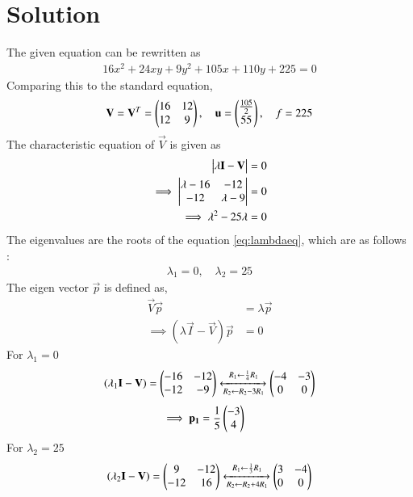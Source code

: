 \documentclass[journal,12pt,twocolumn]{IEEEtran}
\begin{document}
\section{Solution}
The given equation can be rewritten as
\begin{align}\label{eq:quadraticparabola}
    16x^2+24xy+9y^2+105x+110y+225 = 0
\end{align}
Comparing this to the standard equation,
\begin{align}
    \mathbf{V} = \mathbf{V}^T = \begin{pmatrix}16 & 12\\12 & 9\end{pmatrix}, \quad \mathbf{u} = \begin{pmatrix}\frac{105}{2} \\ 55\end{pmatrix}, \quad f = 225 \label{eq:Vufvals}
\end{align}
The characteristic equation of $\vec{V}$ is given as
\begin{align}
    \begin{vmatrix}\lambda\mathbf{I}-\mathbf{V}\end{vmatrix} = 0\\
    \implies \begin{vmatrix}\lambda-16 & -12 \\ -12 & \lambda-9\end{vmatrix} = 0\\
    \implies \lambda^2 -25\lambda = 0 \label{eq:lambdaeq}
\end{align}
The eigenvalues are the roots of the equation \eqref{eq:lambdaeq}, which are as follows :
\begin{align}
    \lambda_1 = 0, \quad \lambda_2 = 25 \label{eq:eigenval}
\end{align}
The eigen vector $\vec{p}$ is defined as, 
\begin{align}
    \vec{V}\vec{p} &= \lambda\vec{p}\\
    \implies(\lambda\vec{I}-\vec{V})\vec{p}&=0
\end{align}
For $\lambda_1=0$
\begin{align}
    (\lambda_1\mathbf{I}-\mathbf{V}) = \begin{pmatrix}-16 & -12\\-12 & -9\end{pmatrix}\xleftrightarrow[R_2\leftarrow R_2-3R_1]{R_1\leftarrow \frac{1}{4}R_1}\begin{pmatrix}-4 & -3\\0 & 0\end{pmatrix}
\end{align}
\begin{align}
    \implies\mathbf{p_1}&=\frac{1}{5}\begin{pmatrix}-3\\4\end{pmatrix}\label{eq:p1val}
\end{align}
For $\lambda_2=25$
\begin{align}
    (\lambda_2\mathbf{I}-\mathbf{V}) = \begin{pmatrix}9 & -12\\-12 & 16\end{pmatrix}\xleftrightarrow[R_2\leftarrow R_2+4R_1]{R_1\leftarrow \frac{1}{3}R_1}\begin{pmatrix}3 & -4\\0 & 0\end{pmatrix}
\end{align}
\end{document}

